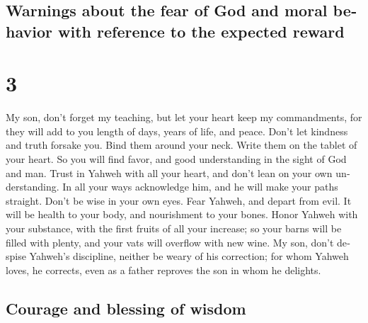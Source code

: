 \begin{paracol}{2}
\switchcolumn
\begin{otherlanguage}{english}

\hypertarget{warnings-about-the-fear-of-god-and-moral-behavior-with-reference-to-the-expected-reward}{%
\subsection{Warnings about the fear of God and moral behavior with
reference to the expected
reward}\label{warnings-about-the-fear-of-god-and-moral-behavior-with-reference-to-the-expected-reward}}

\hypertarget{section-5}{%
\section{3}\label{section-5}}

 My son, don't forget my teaching, but let your heart keep
my commandments,  for they will add to you length of days,
years of life, and peace.  Don't let kindness and truth
forsake you. Bind them around your neck. Write them on the tablet of
your heart.  So you will find favor, and good
understanding in the sight of God and man.  Trust in
Yahweh with all your heart, and don't lean on your own understanding.
 In all your ways acknowledge him, and he will make your
paths straight.  Don't be wise in your own eyes. Fear
Yahweh, and depart from evil.  It will be health to your
body, and nourishment to your bones.  Honor Yahweh with
your substance, with the first fruits of all your increase;
 so your barns will be filled with plenty, and your vats
will overflow with new wine.  My son, don't despise
Yahweh's discipline, neither be weary of his correction; 
for whom Yahweh loves, he corrects, even as a father reproves the son in
whom he delights.

\hypertarget{courage-and-blessing-of-wisdom}{%
\subsection{Courage and blessing of
wisdom}\label{courage-and-blessing-of-wisdom}}


\end{otherlanguage}
\end{paracol}
